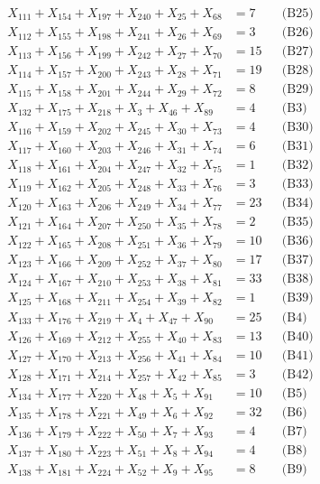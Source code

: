 \documentclass[a4paper,10pt]{article}
\begin{document}
{\begin{align}
X_{111} + X_{154} + X_{197} + X_{240} + X_{25} + X_{68} &= 7 && \text{(B25)} \\
X_{112} + X_{155} + X_{198} + X_{241} + X_{26} + X_{69} &= 3 && \text{(B26)} \\
X_{113} + X_{156} + X_{199} + X_{242} + X_{27} + X_{70} &= 15 && \text{(B27)} \\
X_{114} + X_{157} + X_{200} + X_{243} + X_{28} + X_{71} &= 19 && \text{(B28)} \\
X_{115} + X_{158} + X_{201} + X_{244} + X_{29} + X_{72} &= 8 && \text{(B29)} \\
X_{132} + X_{175} + X_{218} + X_{3} + X_{46} + X_{89} &= 4 && \text{(B3)} \\
X_{116} + X_{159} + X_{202} + X_{245} + X_{30} + X_{73} &= 4 && \text{(B30)} \\
X_{117} + X_{160} + X_{203} + X_{246} + X_{31} + X_{74} &= 6 && \text{(B31)} \\
X_{118} + X_{161} + X_{204} + X_{247} + X_{32} + X_{75} &= 1 && \text{(B32)} \\
X_{119} + X_{162} + X_{205} + X_{248} + X_{33} + X_{76} &= 3 && \text{(B33)} \\
X_{120} + X_{163} + X_{206} + X_{249} + X_{34} + X_{77} &= 23 && \text{(B34)} \\
X_{121} + X_{164} + X_{207} + X_{250} + X_{35} + X_{78} &= 2 && \text{(B35)} \\
X_{122} + X_{165} + X_{208} + X_{251} + X_{36} + X_{79} &= 10 && \text{(B36)} \\
X_{123} + X_{166} + X_{209} + X_{252} + X_{37} + X_{80} &= 17 && \text{(B37)} \\
X_{124} + X_{167} + X_{210} + X_{253} + X_{38} + X_{81} &= 33 && \text{(B38)} \\
X_{125} + X_{168} + X_{211} + X_{254} + X_{39} + X_{82} &= 1 && \text{(B39)} \\
\allowbreak
X_{133} + X_{176} + X_{219} + X_{4} + X_{47} + X_{90} &= 25 && \text{(B4)} \\
X_{126} + X_{169} + X_{212} + X_{255} + X_{40} + X_{83} &= 13 && \text{(B40)} \\
X_{127} + X_{170} + X_{213} + X_{256} + X_{41} + X_{84} &= 10 && \text{(B41)} \\
X_{128} + X_{171} + X_{214} + X_{257} + X_{42} + X_{85} &= 3 && \text{(B42)} \\
X_{134} + X_{177} + X_{220} + X_{48} + X_{5} + X_{91} &= 10 && \text{(B5)} \\
X_{135} + X_{178} + X_{221} + X_{49} + X_{6} + X_{92} &= 32 && \text{(B6)} \\
X_{136} + X_{179} + X_{222} + X_{50} + X_{7} + X_{93} &= 4 && \text{(B7)} \\
X_{137} + X_{180} + X_{223} + X_{51} + X_{8} + X_{94} &= 4 && \text{(B8)} \\
X_{138} + X_{181} + X_{224} + X_{52} + X_{9} + X_{95} &= 8 && \text{(B9)} \\
\end{align}}
\end{document}

